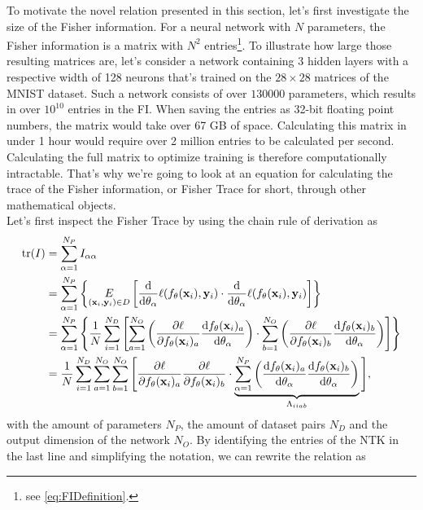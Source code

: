 To motivate the novel relation presented in this section, let's first investigate the size of the Fisher information. For a neural network with $N$ parameters, the Fisher information is a matrix with $N^2$ entries\footnote{see \cref{eq:FIDefinition}.}. To illustrate how large those resulting matrices are, let's consider a network containing 3 hidden layers with a respective width of 128 neurons that's trained on the $28\times28$ matrices of the MNIST dataset. Such a network consists of over $130000$ parameters, which results in over $10^{10}$ entries in the FI. When saving the entries as 32-bit floating point numbers, the matrix would take over 67 GB of space. Calculating  this matrix in under 1 hour would require over 2 million entries to be calculated per second. Calculating the full matrix to optimize training is therefore computationally intractable. That's why we're going to look at an equation for calculating the trace of the Fisher information, or Fisher Trace for short, through other mathematical objects.\\
Let's first inspect the Fisher Trace by using the chain rule of derivation as
\begin{equation}
	\begin{split}
		\mathrm{tr}(I) &= \sum_{\alpha = 1}^{N_P} I_{\alpha\alpha}\\
		&= \sum_{\alpha = 1}^{N_P} \left\{\underset{(\mathbf{x}_i, \mathbf{y}_i) \in D}{E} \left[\frac{\mathrm{d}}{\mathrm{d}\theta_\alpha}\ell(f_\theta(\mathbf{x}_i),\mathbf{y}_i)\cdot \frac{\mathrm{d}}{\mathrm{d}\theta_\alpha}\ell(f_\theta(\mathbf{x}_i),\mathbf{y}_i)\right]\right\}\\
		&= \sum_{\alpha = 1}^{N_P} \left\{ \frac{1}{N} \sum_{i = 1}^{N_D} \left[\sum_{a=1}^{N_O}\left(\frac{\partial\ell}{\partial f_\theta(\mathbf{x}_i)_a}\frac{\mathrm{d}f_\theta(\mathbf{x}_i)_a}{\mathrm{d}\theta_\alpha}\right)\cdot\sum_{b=1}^{N_O}\left(\frac{\partial\ell}{\partial f_\theta(\mathbf{x}_i)_b}\frac{\mathrm{d}f_\theta(\mathbf{x}_i)_b}{\mathrm{d}\theta_\alpha}\right)\right]\right\}\\
		&= \frac{1}{N} \sum_{i = 1}^{N_D} \sum_{a=1}^{N_O} \sum_{b=1}^{N_O} \Bigg[\frac{\partial\ell}{\partial f_\theta(\mathbf{x}_i)_a}\frac{\partial\ell}{\partial f_\theta(\mathbf{x}_i)_b} \cdot\underbrace{ \sum_{\alpha = 1}^{N_P} \left(\frac{\mathrm{d}f_\theta(\mathbf{x}_i)_a}{\mathrm{d}\theta_\alpha}\frac{\mathrm{d}f_\theta(\mathbf{x}_i)_b}{\mathrm{d}\theta_\alpha}\right)}_{\Lambda_{iiab}}\Bigg],
	\end{split} 
\end{equation}
with the amount of parameters $N_P$, the amount of dataset pairs $N_D$ and the output dimension of the network $N_O$. By identifying the entries of the NTK in the last line and simplifying the notation, we can rewrite the relation as
